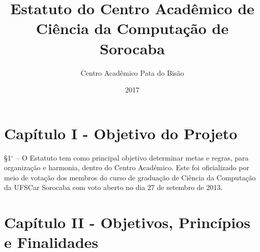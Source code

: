 \documentclass[12pt]{article}
\title{Estatuto do Centro Acadêmico de Ciência da Computação de Sorocaba}
\author{Centro Acadêmico Pata do Bisão}
\date{2017}
\begin{document}
\maketitle 
\clearpage

\section{Capítulo I - Objetivo do Projeto}
    \S 1$^{\circ}$ -- O Estatuto tem como principal objetivo determinar metas e
    regras, para organização e harmonia, dentro do Centro Acadêmico. Este foi
    oficializado por meio de votação dos membros do curso de graduação de
    Ciência da Computação da UFSCar Sorocaba com voto aberto no dia 27 de
    setembro de 2013.

\section{Capítulo II - Objetivos, Princípios e Finalidades}
\end{document}
